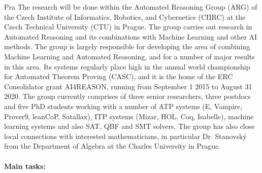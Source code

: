 \begin{sitedescription}{Pra}
The research will be done within the
Automated Reasoning
Group
(ARG) of the 
Czech Institute of Informatics, Robotics, and Cybernetics (CIIRC)
at the Czech Technical University (CTU) in Prague. The group carries
out research in Automated Reasoning and its combinations with Machine
Learning and other AI methods. The group is largely responsible for
developing the area of combining Machine Learning and Automated
Reasoning, and for a number of major results in this area.  Its systems
regularly place high in the annual world championship for Automated
Theorem Proving (CASC), and it is the home of the ERC Consolidator
grant AI4REASON, running from September 1 2015 to August 31 2020. The
group currently comprises of three senior researchers, three postdocs
and five PhD students working with a number of ATP systems (E,
Vampire, Prover9, leanCoP, Satallax), ITP systems (Mizar, HOL, Coq,
Isabelle), machine learning systems and also SAT, QBF and SMT
solvers. The group has also close local connections with interested
mathematicians, in particular Dr. Stanovsk\'y from the Department of
Algebra at the Charles University in Prague. 



\paragraph{Main tasks:}


\end{sitedescription}
